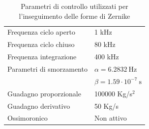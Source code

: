 \begin{table}
\centering
\footnotesize
\begin{tabular}{ll}
\toprule
Frequenza ciclo aperto & 1 kHz\\
Frequenza ciclo chiuso & 80 kHz\\
Frequenza integrazione & 400 kHz\\
Parametri di smorzamento & $\alpha = 6.2832~\text{Hz}$\\
&$\beta=1.59\cdot10^{-7}~\text{s}$\\
Guadagno proporzionale & 100000 Kg/s$^2$\\
Guadagno derivativo & 50 Kg/s\\
Ossimoronico & Non attivo\\
\bottomrule
\end{tabular}
\label{tab:8zergains}
\caption{Parametri di controllo utilizzati per l'inseguimento delle forme di Zernike}
\end{table}

\clearpage
